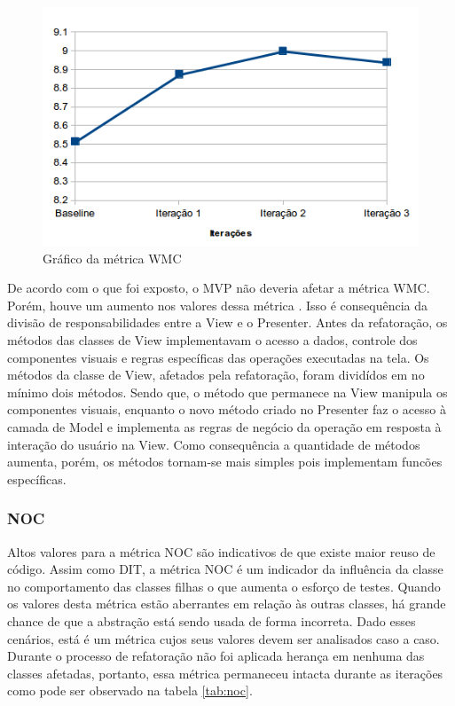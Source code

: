 \documentclass[conference]{IEEEtran}
\begin{document}
\begin{figure}[!htb]
	
	\begin{center}
		\includegraphics[scale=0.5]{img/wmc.png}
	\end{center}
	\caption{\label{fig:wmc} Gráfico da métrica WMC}   
	
\end{figure}



De acordo com o que foi exposto, o MVP não deveria afetar a métrica WMC. Porém,
houve um aumento nos valores dessa métrica . Isso é consequência da divisão de
responsabilidades entre a View e o Presenter. Antes da refatoração, os métodos
das classes de View implementavam o acesso a dados, controle dos componentes
visuais e regras específicas das operações executadas na tela. Os métodos da
classe de View, afetados pela refatoração, foram dividídos em no mínimo dois
métodos. Sendo que, o método que permanece na View manipula os componentes
visuais, enquanto o novo método criado no Presenter faz o acesso à camada de
Model e implementa as regras de negócio da operação em resposta à interação do
usuário na View. Como consequência a quantidade de métodos aumenta, porém, os
métodos tornam-se mais simples pois implementam funcões específicas. 

\subsubsection{NOC}

Altos valores para a métrica NOC são indicativos de que existe maior reuso de
código. Assim como DIT, a métrica NOC é um indicador da influência da classe
no comportamento das classes filhas o que aumenta o esforço de testes. Quando os
valores desta métrica estão aberrantes em relação às outras classes, há grande
chance de que a abstração está sendo usada de forma incorreta. Dado esses cenários, está é um métrica cujos
seus valores devem ser analisados caso a caso. Durante o processo de refatoração
não foi aplicada herança em nenhuma das classes afetadas, portanto, essa métrica permaneceu intacta durante as iterações
como pode ser observado na tabela \ref{tab:noc}. %
\end{document}

